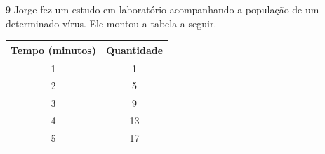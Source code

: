 \begin{escolha}
\begin{boxmedio}
\begin{boxmedio}
{\begin{boxpeq}
\begin{boxpeq}
{\begin{boxpeq}
\begin{boxmedio}
\begin{boxmedio}
\begin{boxpeq}
\begin{boxmedio}
\begin{boxpeq}
\begin{boxpeq}
\begin{boxpeq}
\begin{boxpeq}
\begin{boxmedio}
{\begin{boxmedio}
\begin{boxmedio}
\begin{boxpeq}
\begin{boxmedio}
\begin{boxpeq}
\begin{boxpeq}
\begin{boxpeq}
\begin{escolha}
{\begin{boxmedio}
\begin{boxpeq}
\begin{boxpeq}
\begin{boxpeq}
\begin{boxpeq}
\begin{boxpeq}
\begin{boxmedio}
\begin{boxpeq}
\begin{boxpeq}
\begin{boxpeq}
{\begin{boxpeq}
\begin{boxmedio}
\begin{boxpeq}
\begin{boxpeq}
\begin{boxpeq}
{\begin{boxpeq}
\begin{boxmedio}
{\begin{boxpeq}
\begin{boxpeq}
\begin{boxmedio}
\begin{boxmedio}
\begin{boxpeq}
\begin{boxpeq}
{\begin{boxpeq}
\begin{boxpeq}
\begin{boxpeq}
\begin{boxpeq}
\begin{boxpeq}
\begin{escolha}
\begin{escolha}
{\begin{boxmedio}
\begin{boxpeq}
\begin{q°}
\begin{boxmedio}
\begin{boxpeq}
\begin{boxpeq}
\begin{boxmedio}
\begin{boxmedio}
\begin{boxmedio}
\begin{boxmedio}
{\begin{escolha}
\begin{escolha}
\begin{escolha}
\begin{escolha}
\begin{escolha}
\begin{escolha}
\num{9} Jorge fez um estudo em laboratório acompanhando a população de um
determinado vírus. Ele montou a tabela a seguir.

\begin{table}[]
\begin{tabular}{|c|c|}
\hline
\rowcolor[HTML]{CD9934} 
\textbf{Tempo (minutos)} & \textbf{Quantidade} \\ \hline
\rowcolor[HTML]{FFCE93} 
1 & 1 \\ \hline
2 & 5 \\ \hline
\rowcolor[HTML]{FFCE93} 
{\color[HTML]{333333} 3} & {\color[HTML]{333333} 9} \\ \hline
4 & 13 \\ \hline
\rowcolor[HTML]{FFCE93} 
{\color[HTML]{333333} 5} & {\color[HTML]{333333} 17} \\ \hline
\end{tabular}
\end{table}


\end{escolha}
\end{escolha}
\end{escolha}
\end{escolha}
\end{escolha}
\end{escolha}}
\end{boxmedio}
\end{boxmedio}
\end{boxmedio}
\end{boxmedio}
\end{boxpeq}
\end{boxpeq}
\end{boxmedio}
\end{q°}
\end{boxpeq}
\end{boxmedio}}
\end{escolha}
\end{escolha}
\end{boxpeq}
\end{boxpeq}
\end{boxpeq}
\end{boxpeq}
\end{boxpeq}}
\end{boxpeq}
\end{boxpeq}
\end{boxmedio}
\end{boxmedio}
\end{boxpeq}
\end{boxpeq}}
\end{boxmedio}
\end{boxpeq}}
\end{boxpeq}
\end{boxpeq}
\end{boxpeq}
\end{boxmedio}
\end{boxpeq}}
\end{boxpeq}
\end{boxpeq}
\end{boxpeq}
\end{boxmedio}
\end{boxpeq}
\end{boxpeq}
\end{boxpeq}
\end{boxpeq}
\end{boxpeq}
\end{boxmedio}}
\end{escolha}
\end{boxpeq}
\end{boxpeq}
\end{boxpeq}
\end{boxmedio}
\end{boxpeq}
\end{boxmedio}
\end{boxmedio}}
\end{boxmedio}
\end{boxpeq}
\end{boxpeq}
\end{boxpeq}
\end{boxpeq}
\end{boxmedio}
\end{boxpeq}
\end{boxmedio}
\end{boxmedio}
\end{boxpeq}}
\end{boxpeq}
\end{boxpeq}}
\end{boxmedio}
\end{boxmedio}
\end{escolha}
